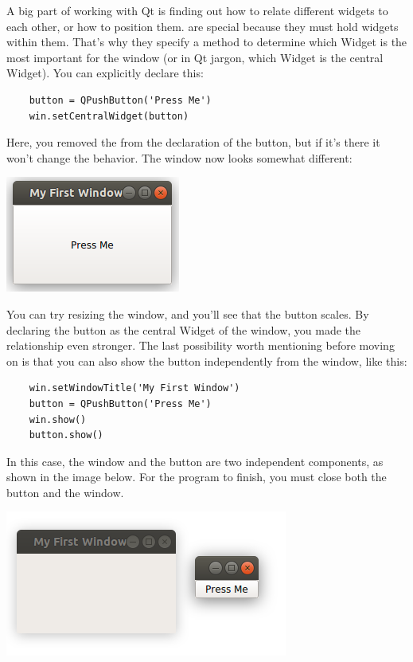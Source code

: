 
A big part of working with Qt is finding out how to relate different widgets to each other, or how to position them.  are special because they must hold widgets within them. That's why they specify a method to determine which Widget is the most important for the window (or in Qt jargon, which Widget is the central Widget). You can explicitly declare this:

\begin{verbatim}
    button = QPushButton('Press Me')
    win.setCentralWidget(button)
\end{verbatim}

Here, you removed the  from the declaration of the button, but if it's there it won't change the behavior. The window now looks somewhat different:

\begin{center}
    \includegraphics[width=.3\textwidth]{images/Chapter_08/03_simple_window_and_central_widget.png}
\end{center}

You can try resizing the window, and you'll see that the button scales. By declaring the button as the central Widget of the window, you made the relationship even stronger. The last possibility worth mentioning before moving on is that you can also show the button independently from the window, like this:

\begin{verbatim}
    win.setWindowTitle('My First Window')
    button = QPushButton('Press Me')
    win.show()
    button.show()
\end{verbatim}

In this case, the window and the button are two independent components, as shown in the image below. For the program to finish, you must close both the button and the window.

\begin{center}
    \includegraphics[width=.3\textwidth]{images/Chapter_08/04_window_button_separated.png}
\end{center}

